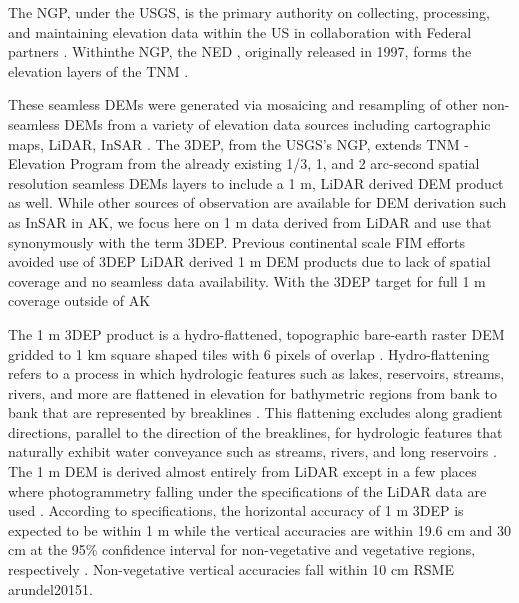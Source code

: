 \documentclass[preprint,review,12pt]{dependencies/elsarticle}
\begin{document}
The \ac{NGP}, under the \ac{USGS}, is the primary authority on collecting, processing, and maintaining elevation data within the \ac{US} in collaboration with Federal partners \citep{omb2016circularA16}.
Withinthe \ac{NGP}, the \ac{NED} \citep{gesch2002national,gesch2007digital}, originally released in 1997, forms the elevation layers of the \ac{TNM} \citep{gesch2009national,archuleta2017national,arundel2015preparing,arundel2018assimilation}.

These seamless \acp{DEM} were generated via mosaicing and resampling of other non-seamless \acp{DEM} from a variety of elevation data sources including cartographic maps, \ac{LiDAR}, \ac{InSAR} \citep{gesch2002national}.
The \ac{3DEP}, from the \ac{USGS}'s \ac{NGP}, extends \ac{TNM} - Elevation Program from the already existing 1/3, 1, and 2 arc-second spatial resolution seamless \acp{DEM} layers to include a 1 \ac{m}, \ac{LiDAR} derived \ac{DEM} product as well.
While other sources of observation are available for \ac{DEM} derivation such as \ac{InSAR} in \ac{AK}, we focus here on 1 \ac{m} data derived from \ac{LiDAR} and use that synonymously with the term \ac{3DEP}.
Previous continental scale \ac{FIM} efforts avoided use of \ac{3DEP} \ac{LiDAR} derived 1 \ac{m} \ac{DEM} products due to lack of spatial coverage and no seamless data availability.
With the \ac{3DEP} target for full 1 \ac{m} coverage outside of \ac{AK}

The 1 \ac{m} \ac{3DEP} product is a hydro-flattened, topographic bare-earth raster \ac{DEM} gridded to 1 \ac{km} square shaped tiles with 6 pixels of overlap \citep{arundel20151}.
Hydro-flattening refers to a process in which hydrologic features such as lakes, reservoirs, streams, rivers, and more are flattened in elevation for bathymetric regions from bank to bank that are represented by breaklines \citep{archuleta2017national}.
This flattening excludes along gradient directions, parallel to the direction of the breaklines, for hydrologic features that naturally exhibit water conveyance such as streams, rivers, and long reservoirs \citep{arundel20151}.
The 1 \ac{m} \ac{DEM} is derived almost entirely from \ac{LiDAR} except in a few places where photogrammetry falling under the specifications of the \ac{LiDAR} data are used \citep{arundel20151}.
According to specifications, the horizontal accuracy of 1 \ac{m} \ac{3DEP} is expected to be within 1 \ac{m} while the vertical accuracies are within 19.6 \ac{cm} and 30 \ac{cm} at the 95\% confidence interval for non-vegetative and vegetative regions, respectively \citep{arundel20151}.
Non-vegetative vertical accuracies fall within 10 \ac{cm} \ac{RSME} \ac{arundel20151}.
\end{document}
